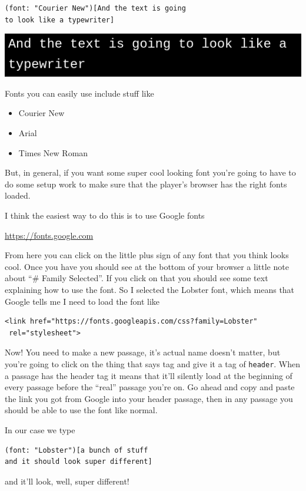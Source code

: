 \documentclass[a5paper,11pt]{article}
\begin{document}
\begin{verbatim}
(font: "Courier New")[And the text is going
to look like a typewriter]
\end{verbatim}

\includegraphics[width=0.7\linewidth]{couriertext}


Fonts you can easily use include stuff like
\begin{itemize}
\item Courier New
\item Arial
  \item Times New Roman
\end{itemize}

But, in general, if you want some super cool looking font you're going to have to do some setup work to make sure that the player's browser has the right fonts loaded.

I think the easiest way to do this is to use Google fonts

\url{https://fonts.google.com}

From here you can click on the little plus sign of any font that you think looks cool. Once you have you should see at the bottom of your browser a little note about ``\# Family Selected''. If you click on that you should see some text explaining how to use the font. So I selected the Lobster font, which means that Google tells me I need to load the font like
\begin{verbatim}
<link href="https://fonts.googleapis.com/css?family=Lobster" 
 rel="stylesheet">
\end{verbatim}

Now! You need to make a new passage, it's actual name doesn't matter, but you're going to click on the thing that says tag and give it a tag of \texttt{header}. When a passage has the header tag it means that it'll silently load at the beginning of every passage before the ``real'' passage you're on. Go ahead and copy and paste the link you got from Google into your header passage, then in any passage you should be able to use the font like normal.

In our case we type
\begin{verbatim}
(font: "Lobster")[a bunch of stuff 
and it should look super different]
\end{verbatim}
and it'll look, well, super different!
\end{document}
